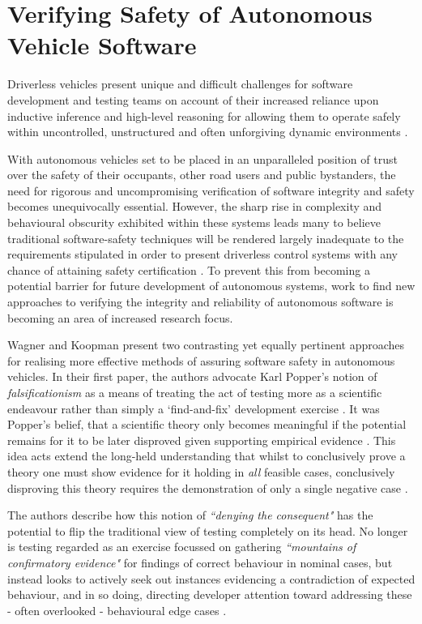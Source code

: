 \documentclass[conference]{IEEEtran}
\begin{document}
\section{Verifying Safety of Autonomous Vehicle Software}

Driverless vehicles present unique and difficult challenges for software development and testing teams on account of their increased reliance upon inductive inference and high-level reasoning for allowing them to operate safely within uncontrolled, unstructured and often unforgiving dynamic environments \cite{wagner-1}. 

 With autonomous vehicles set to be placed in an unparalleled position of trust over the safety of their occupants, other road users and public bystanders, the need for rigorous and uncompromising verification of software integrity and safety becomes unequivocally essential. However, the sharp rise in complexity and behavioural obscurity exhibited within these systems leads many to believe traditional software-safety techniques will be rendered largely inadequate to the requirements stipulated in order to present driverless control systems with any chance of attaining safety certification \cite{wagner-1, wagner-2, wongpiromsarn, fisher-1}. To prevent this from becoming a potential barrier for future development of autonomous systems, work to find new approaches to verifying the integrity and reliability of autonomous software is becoming an area of increased research focus. 
 
 Wagner and Koopman present two contrasting yet equally pertinent approaches for realising more effective methods of assuring software safety in autonomous vehicles. In their first paper, the authors advocate Karl Popper's notion of \textit{falsificationism} as a means of treating the act of testing more as a scientific endeavour rather than simply a `find-and-fix' development exercise \cite{wagner-1}. It was Popper's belief, that a scientific theory only becomes  meaningful if the potential remains for it to be later disproved given supporting empirical evidence \cite{wagner-1}. This idea acts extend the long-held understanding that whilst to conclusively prove a theory one must show evidence for it holding in \textit{all} feasible cases, conclusively disproving this theory requires the demonstration of only a single negative case \cite{wagner-1}. 
 
 The authors describe how this notion of \textit{``denying the consequent"} has the potential to flip the traditional view of testing completely on its head. No  longer is testing regarded as an exercise focussed on gathering \textit{``mountains of confirmatory evidence"} for findings of correct behaviour in nominal cases, but instead looks to actively seek out instances evidencing a contradiction of expected behaviour, and in so doing, directing developer attention toward addressing these - often overlooked - behavioural edge cases \cite{wagner-1}. 
 
\end{document}
